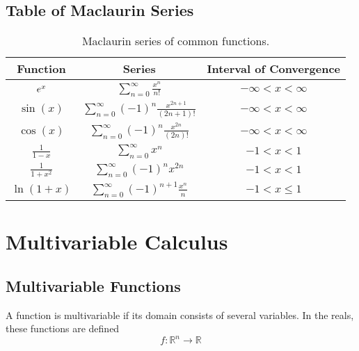 \documentclass{article}
\begin{document}
\subsection{Table of Maclaurin Series}
\begin{table}[H]
    \centering
    \begin{tabular}{c c c}
        \toprule
        \textbf{Function}                         & \textbf{Series}                                                                                 & \textbf{Interval of Convergence} \\
        \midrule
        \(e^{x}\)                                & \(\displaystyle \sum_{n=0}^{\infty} \frac{x^n}{n!}\)                                            & \(-\infty < x < \infty\)         \\[14pt]
        \(\sin{\left( x \right)}\)                & \(\displaystyle \sum_{n=0}^{\infty} \left( -1 \right)^n \frac{x^{2n+1}}{\left( 2n+1 \right)!}\) & \(-\infty < x < \infty\)         \\[14pt]
        \(\cos{\left( x \right)}\)                & \(\displaystyle \sum_{n=0}^{\infty} \left( -1 \right)^n \frac{x^{2n}}{\left( 2n \right)!}\)     & \(-\infty < x < \infty\)         \\[14pt]
        \(\displaystyle \frac{1}{1-x}\)           & \(\displaystyle \sum_{n=0}^{\infty} x^n\)                                                       & \(-1 < x < 1\)                   \\[14pt]
        \(\displaystyle \frac{1}{1+x^2}\)         & \(\displaystyle \sum_{n=0}^{\infty} \left( -1 \right)^n x^{2n}\)                                & \(-1 < x < 1\)                   \\[14pt]
        \(\displaystyle \ln{\left( 1+x \right)}\) & \(\displaystyle \sum_{n=0}^{\infty} \left( -1 \right)^{n+1} \frac{x^n}{n}\)                     & \(-1 < x \leq 1\)                \\[14pt]
        \bottomrule
    \end{tabular}
    \caption{Maclaurin series of common functions.}
\end{table}
\newpage
\section{Multivariable Calculus}
\subsection{Multivariable Functions}
\begin{definition}
    A function is multivariable if its domain consists of several variables. In
    the reals, these functions are defined
    \begin{equation*}
        f:\mathbb{R}^n\to\mathbb{R}
    \end{equation*}
\end{definition}
\end{document}
